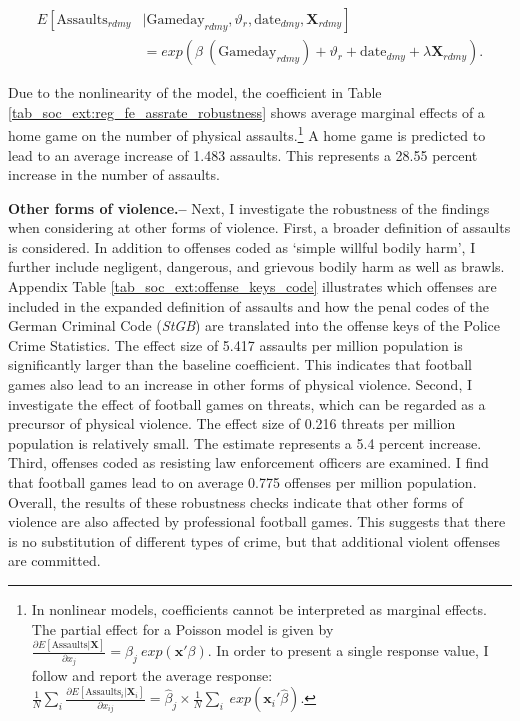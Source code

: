 \begin{align}
E\left[ \text{Assaults}_{rdmy}\right.&|\left.\text{Gameday}_{rdmy},\vartheta_r,\text{date}_{dmy}, \mathbf{X}_{rdmy} \right] \nonumber \\ &= exp\left( \beta\ (\text{Gameday}_{rdmy}) + \vartheta_r + \text{date}_{dmy} + \lambda\mathbf{X}_{rdmy} \right). 
\label{eq_soc_ext:poisson_model}
\end{align}

Due to the nonlinearity of the model, the coefficient in Table \ref{tab_soc_ext:reg_fe_assrate_robustness} shows average marginal effects of a home game on the number of physical assaults.\footnote{In nonlinear models, coefficients cannot be interpreted as marginal effects. The partial effect for a Poisson model is given by $\frac{\partial E\left[ \text{Assaults}| \mathbf{X}\right]}{\partial x_j} = \beta_j\ exp(\mathbf{x'}\beta)$. In order to present a single response value, I follow \cite{cameron2005microeconometrics} and report the average response: $\frac{1}{N}\sum_i \frac{\partial E\left[ \text{Assaults}_i| \mathbf{X}_i\right]}{\partial x_{ij}} = \hat\beta_j \times \frac{1}{N} \sum_i\ exp(\mathbf{x}_i'\hat\beta)$.} A home game is predicted to lead to an average increase of 1.483 assaults. This represents a 28.55 percent increase in the number of assaults. \newline


\textbf{Other forms of violence.--} Next, I investigate the robustness of the findings when considering at other forms of violence. First, a broader definition of assaults is considered. In addition to offenses coded as `simple willful bodily harm', I further include negligent, dangerous, and grievous bodily harm as well as brawls. Appendix Table \ref{tab_soc_ext:offense_keys_code} illustrates which offenses are included in the expanded definition of assaults and how the penal codes of the German Criminal Code (\textit{StGB}) are translated into the offense keys of the Police Crime Statistics. The effect size of 5.417 assaults per million population is significantly larger than the baseline coefficient. This indicates that football games also lead to an increase in other forms of physical violence. Second, I investigate the effect of football games on threats, which can be regarded as a precursor of physical violence. The effect size of 0.216 threats per million population is relatively small. The estimate represents a 5.4 percent increase. Third, offenses coded as resisting law enforcement officers are examined. I find that football games lead to on average 0.775 offenses per million population. Overall, the results of these robustness checks indicate that other forms of violence are also affected by professional football games. This suggests that there is no substitution of different types of crime, but that additional violent offenses are committed.\newline

